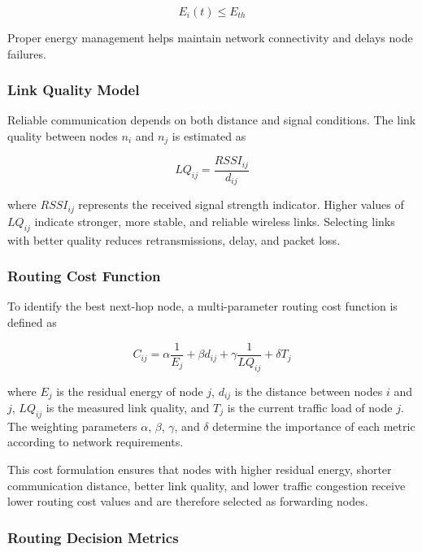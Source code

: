 \documentclass[a4paper,fleqn]{cas-dc}
\numberwithin{equation}{section}
\begin{document}
\begin{equation}
\label{eq:dead}
E_i(t)\leq E_{th}
\end{equation}

Proper energy management helps maintain network connectivity and delays node failures.

\subsubsection{Link Quality Model}

Reliable communication depends on both distance and signal conditions. The link quality between nodes $n_i$ and $n_j$ is estimated as

\begin{equation}
\label{eq:lq}
LQ_{ij}=\frac{RSSI_{ij}}{d_{ij}}
\end{equation}

where $RSSI_{ij}$ represents the received signal strength indicator. Higher values of $LQ_{ij}$ indicate stronger, more stable, and reliable wireless links. Selecting links with better quality reduces retransmissions, delay, and packet loss.

\subsubsection{Routing Cost Function}

To identify the best next-hop node, a multi-parameter routing cost function is defined as

\begin{equation}
\label{eq:cost}
C_{ij}=
\alpha \frac{1}{E_j}
+\beta d_{ij}
+\gamma \frac{1}{LQ_{ij}}
+\delta T_j
\end{equation}

where $E_j$ is the residual energy of node $j$, $d_{ij}$ is the distance between nodes $i$ and $j$, $LQ_{ij}$ is the measured link quality, and $T_j$ is the current traffic load of node $j$. The weighting parameters $\alpha$, $\beta$, $\gamma$, and $\delta$ determine the importance of each metric according to network requirements.

This cost formulation ensures that nodes with higher residual energy, shorter communication distance, better link quality, and lower traffic congestion receive lower routing cost values and are therefore selected as forwarding nodes.

\subsubsection{Routing Decision Metrics}
\end{document}
